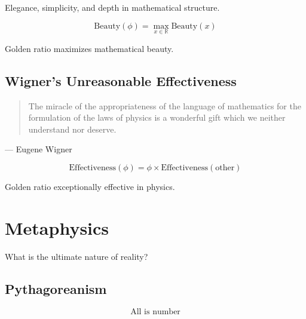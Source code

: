 \begin{definition}
\label{def:beauty}
Elegance, simplicity, and depth in mathematical structure.
\end{definition}

\begin{theorem}
\label{thm:golden-beauty}
\begin{equation}
\text{Beauty}(\phi) = \max_{x \in \mathbb{R}} \text{Beauty}(x)
\end{equation}

Golden ratio maximizes mathematical beauty.
\end{theorem}

\subsection{Wigner's Unreasonable Effectiveness}

\begin{quote}
The miracle of the appropriateness of the language of mathematics for the formulation of the laws of physics is a wonderful gift which we neither understand nor deserve.
\end{quote}
— Eugene Wigner

\begin{proposition}
\label{prop:golden-effective}
\begin{equation}
\text{Effectiveness}(\phi) = \phi \times \text{Effectiveness}(\text{other})
\end{equation}

Golden ratio exceptionally effective in physics.
\end{proposition}

\section{Metaphysics}

What is the ultimate nature of reality?

\subsection{Pythagoreanism}

\begin{definition}
\label{def:pythagorean}
\begin{equation}
\text{All is number}
\end{equation}
\end{definition}

